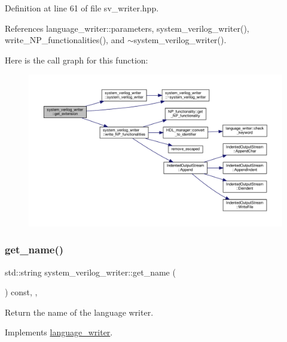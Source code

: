 Definition at line 61 of file sv\+\_\+writer.\+hpp.



References language\+\_\+writer\+::parameters, system\+\_\+verilog\+\_\+writer(), write\+\_\+\+N\+P\+\_\+functionalities(), and $\sim$system\+\_\+verilog\+\_\+writer().

Here is the call graph for this function\+:
\nopagebreak
\begin{figure}[H]
\begin{center}
\leavevmode
\includegraphics[width=350pt]{d5/d69/classsystem__verilog__writer_a7730b4c523fbdf8e41c4416775194b2f_cgraph}
\end{center}
\end{figure}
\mbox{\label{classsystem__verilog__writer_a176f5235f5fd8ec5a0c84f85382475e3}} 
\subsubsection{\texorpdfstring{get\+\_\+name()}{get\_name()}}
{\footnotesize\ttfamily std\+::string system\+\_\+verilog\+\_\+writer\+::get\+\_\+name (\begin{DoxyParamCaption}{ }\end{DoxyParamCaption}) const\hspace{0.3cm}{\ttfamily [inline]}, {\ttfamily [override]}, {\ttfamily [virtual]}}



Return the name of the language writer. 



Implements \hyperlink{classlanguage__writer_a6eabf4ff2972e00a392a0d2a8b4c5a3a}{language\+\_\+writer}.



